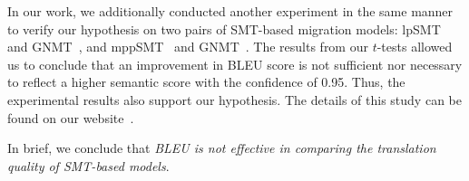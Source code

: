 %
%



In our work, we additionally conducted another experiment in the same
manner to verify our hypothesis on two pairs of SMT-based migration
models: lpSMT~\cite{fse13} and GNMT~\cite{gnmt}, and
mppSMT~\cite{ase15} and GNMT~\cite{gnmt}. The results from our
$t$-tests allowed us to conclude that an improvement in BLEU score is
not sufficient nor necessary to reflect a higher semantic score with
the confidence of 0.95. Thus, the experimental results also support
our hypothesis. The details of this study can be found on our
website~\cite{ruby-website}.

In brief, we conclude that \textit{BLEU is not effective in comparing
  the translation quality of SMT-based models}.
